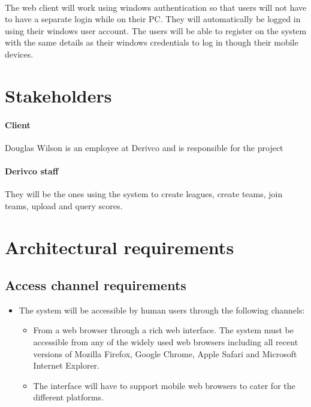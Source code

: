 \documentclass[11pt]{article}
\begin{document}
\paragraph{}The web client will work using windows authentication so that users will not have to have a separate login while on their PC. They will automatically be logged in using their windows user account. The users will be able to register on the system with the same details as their windows credentials to log in though their mobile devices.
\section{Stakeholders}
	\paragraph{Client} Douglas Wilson is an employee at Derivco and is responsible for the project
	\paragraph{Derivco staff} They will be the ones using the system to create leagues, create teams, join teams, upload and query scores. 	
\section{Architectural requirements}
\subsection{Access channel requirements}
\begin{itemize}
\item The system will be accessible by human users through the following channels:
	\begin{itemize}
	\item From a web browser through a rich web interface. The system must be accessible from any of the widely used web browsers including all recent versions of Mozilla Firefox, Google Chrome, Apple Safari 	and Microsoft Internet Explorer.
	\item The interface will have to support mobile web browsers to cater for the different platforms.
	\end{itemize}
\end{itemize}
\end{document}
